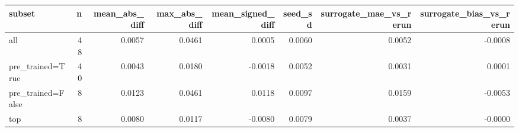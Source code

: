 \begin{tabular}{lrrrrrrr}
\toprule
           subset &  n &  mean\_abs\_diff &  max\_abs\_diff &  mean\_signed\_diff &  seed\_sd &  surrogate\_mae\_vs\_rerun &  surrogate\_bias\_vs\_rerun \\
\midrule
              all & 48 &         0.0057 &        0.0461 &            0.0005 &   0.0060 &                  0.0052 &                  -0.0008 \\
 pre\_trained=True & 40 &         0.0043 &        0.0180 &           -0.0018 &   0.0052 &                  0.0031 &                   0.0001 \\
pre\_trained=False &  8 &         0.0123 &        0.0461 &            0.0118 &   0.0097 &                  0.0159 &                  -0.0053 \\
              top &  8 &         0.0080 &        0.0117 &           -0.0080 &   0.0079 &                  0.0037 &                  -0.0000 \\
\bottomrule
\end{tabular}
